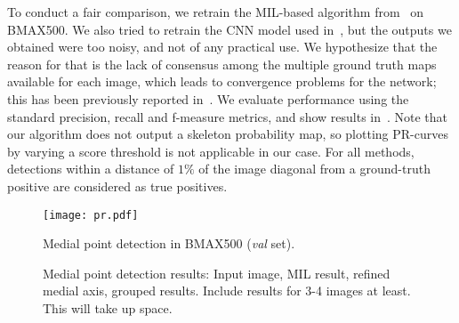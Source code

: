 \documentclass[10pt,twocolumn,letterpaper]{article}
\begin{document}
To conduct a fair comparison, we retrain the MIL-based algorithm from~\cite{tsogkas2012learning} on BMAX500.
We also tried to retrain the CNN model used in~\cite{shen2016object}, but the outputs we obtained were too noisy, 
and not of any practical use.
We hypothesize that the reason for that is the lack of consensus among the multiple ground truth maps
available for each image, which leads to convergence problems for the network; this has been previously
reported in~\cite{xie2015holistically}.
We evaluate performance using the standard precision, recall and f-measure metrics, 
and show results in~.
Note that our algorithm does not output a skeleton probability map, so plotting 
PR-curves by varying a score threshold is not applicable in our case.
For all methods, detections within a distance of $1\%$ of the image diagonal from a ground-truth positive 
are considered as true positives.


\begin{figure}
\centering
\texttt{[image: pr.pdf]}
\caption{Medial point detection in BMAX500 (\emph{val} set).}
\label{fig:experiments:detection:pr}
\end{figure}

\begin{figure}[t]
\centering
\caption{Medial point detection results: Input image, MIL result, refined medial axis, grouped results. 
Include results for 3-4 images at least. This will take up space.}
\label{fig:experiments:detection:examples}
\end{figure}
\end{document}
